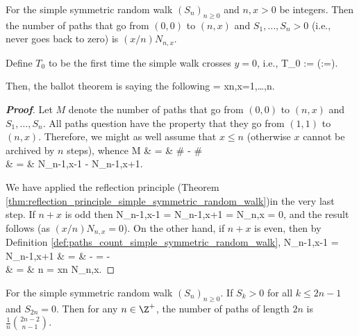 \begin{theorem}\label{thm:ballot_problem}
For the simple symmetric random walk $(S_n)_{n\geq 0}$ and $n,x>0$ be integers. Then the number of paths that go from $(0,0)$ to $(n,x)$ and $S_1,\dots,S_n>0$ (i.e., never goes back to zero) is $(x/n) N_{n,x}$.
\end{theorem}

\begin{remark}
Define $T_0$ to be the first time the simple walk crosses $y=0$, i.e.,
\be
T_0 := \inf{}\qquad (\inf \emptyset :=\infty).
\ee

Then, the ballot theorem is saying the following
\be
\pro{} = \frac xn,\qquad \forall x=1,\dots,n.
\ee
\end{remark}

\begin{proof}[\bf Proof]
Let $M$ denote the number of paths that go from $(0,0)$ to $(n,x)$ and $S_1,\dots,S_n$. All paths question have the property that they go from $(1,1)$ to $(n,x)$. Therefore, we might as well assume that $x\leq n$ (otherwise $x$ cannot be archived by $n$ steps), whence
\beast
M & = & \# - \#\\
& = & N_{n-1,x-1} - N_{n-1,x+1}.
\eeast

We have applied the reflection principle (Theorem \ref{thm:reflection_principle_simple_symmetric_random_walk})in the very last step. If $n+x$ is odd then
\be
N_{n-1,x-1} = N_{n-1,x+1} = N_{n,x} = 0,
\ee
and the result follows (as $(x/n)N_{n,x} = 0$). On the other hand, if $n+x$ is even, then by Definition \ref{def:paths_count_simple_symmetric_random_walk},
\beast
N_{n-1,x-1} = N_{n-1,x+1} & = &  -  =  -  \\
& = & n  = \frac xn N_{n,x}.
\eeast
\end{proof}

\begin{proposition}\label{pro:random_walk_number_paths_greater_than_zero}
For the simple symmetric random walk $(S_n)_{n\geq 0}$. If $S_k > 0$ for all $k\leq 2n-1$ and $S_{2n} = 0$. Then for any $n\in \Z^+$, the number of paths of length $2n$ is $\frac 1{n}\binom{2n-2}{n-1}$.
\end{proposition}

